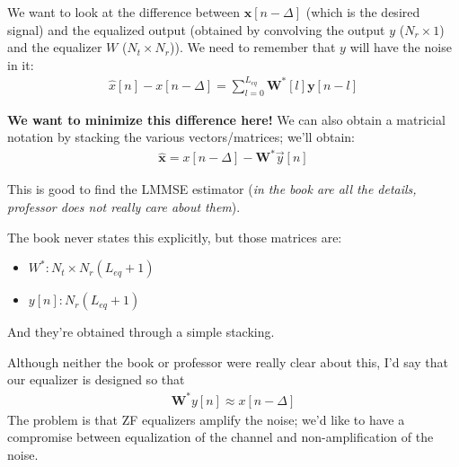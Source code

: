 \documentclass[a4paper, 12pt]{book}
\begin{document}
We want to look at the difference between $\mathbf{x}[n-\Delta]$ (which is the desired signal) and the equalized output (obtained by convolving the output $y$ ($N_r \times 1$) and the equalizer $W$ ($N_t \times N_r$)). We need to remember that $y$ will have the noise in it:
\begin{align}
    \hat{x}[n] - x[n - \Delta] = \sum_{l=0}^{L_{eq}} \mathbf{W}^*[l] \mathbf{y}[n-l] \label{eq:2.159}
\end{align}

\vspace{1em}
\noindent\setlength{\fboxsep}{10pt}\setlength{\fboxrule}{0.5pt}
\vspace{1em}

\textbf{We want to minimize this difference here!} We can also obtain a matricial notation by stacking the various vectors/matrices; we'll obtain:
\begin{align}
    \mathbf{\hat{x}} = x[n-\Delta] - \mathbf{W}^* \vec{y}[n]
\end{align}

This is good to find the LMMSE estimator (\textit{in the book are all the details, professor does not really care about them}).

\begin{remark}
The book never states this explicitly, but those matrices are:
\begin{itemize}
    \item $W^* : N_t \times N_r (L_{eq} + 1)$
    \item $y[n] : N_r (L_{eq} + 1)$
\end{itemize}
And they're obtained through a simple stacking.
\end{remark}

Although neither the book or professor were really clear about this, I'd say that our equalizer is designed so that
\begin{align}
    \mathbf{W}^* y[n] \approx x[n-\Delta]
\end{align}
The problem is that ZF equalizers amplify the noise; we'd like to have a compromise between equalization of the channel and non-amplification of the noise.
\end{document}
